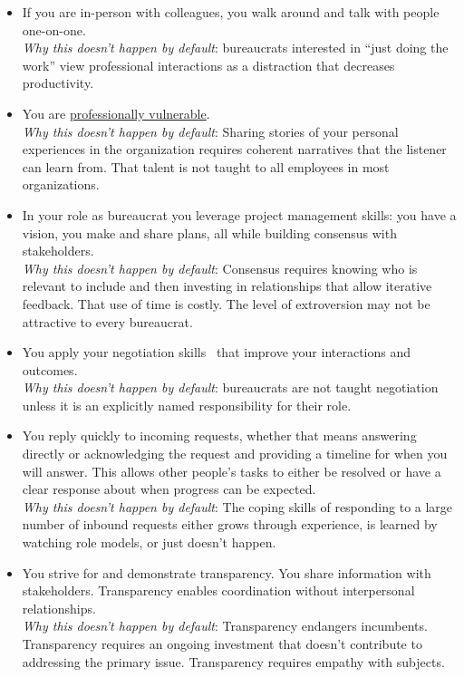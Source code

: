 \begin{itemize}
    \item If you are in-person with colleagues, you walk around and talk with people one-on-one.  \\
    \textit{Why this doesn't happen by default}: bureaucrats interested in ``just doing the work'' view professional interactions as a distraction that decreases productivity. 
    \item You are 
    \hyperref[sec:professional-vulnerability]{professionally vulnerable}. \\
    \textit{Why this doesn't happen by default}: Sharing stories of your personal experiences in the organization requires coherent narratives that the listener can learn from. That talent is not taught to all employees in most organizations. 
    \item In your role as bureaucrat you leverage project management skills: you have a vision, you make and share plans, all while building consensus with stakeholders. \\
    \textit{Why this doesn't happen by default}: Consensus requires knowing who is relevant to include and then investing in relationships that allow iterative feedback. That use of time is costly. The level of extroversion may not be attractive to every bureaucrat.
    \item You apply your negotiation skills~\cite{1982_Cohen} that improve your interactions and outcomes.\\
    \textit{Why this doesn't happen by default}: bureaucrats are not taught negotiation unless it is an explicitly named responsibility for their role. 
    \item You reply quickly to incoming requests, whether that means answering directly or acknowledging the request and providing a timeline for when you will answer. This allows other people's tasks to either be resolved or have a clear response about when progress can be expected. \\
    \textit{Why this doesn't happen by default}: The coping skills of responding to a large number of inbound requests either grows through experience, is learned by watching role models, or just doesn't happen.
    \item You strive for and demonstrate transparency. You share information with stakeholders. Transparency  enables coordination without interpersonal relationships.\\
    \textit{Why this doesn't happen by default}: Transparency endangers incumbents. Transparency requires an ongoing investment that doesn't contribute to addressing the primary issue. Transparency requires empathy with subjects.
\end{itemize}

